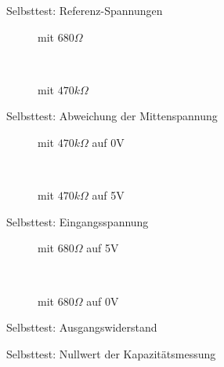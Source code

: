 \begin{figure}[H]
  \centering
  
  \caption{Selbsttest: Referenz-Spannungen}
  \label{fig:SelfTref}
\end{figure}

\begin{figure}[H]
  \begin{subfigure}[b]{9cm}
    \centering
    \resizebox{9cm}{!}{}
    \caption{mit \(680 \Omega\)}
    \label{fig:SelfTMitL}
  \end{subfigure}
  ~
  \begin{subfigure}[b]{9cm}
    \centering
    \resizebox{9cm}{!}{}
    \caption{mit \(470 k\Omega\)}
    \label{fig:SelfTMitH}
  \end{subfigure}
  \caption{Selbsttest: Abweichung der Mittenspannung}
\end{figure}

\begin{figure}[H]
  \begin{subfigure}[b]{9cm}
  \centering
    \resizebox{9cm}{!}{}
    \caption{mit \(470 k\Omega\) auf 0V}
    \label{fig:SelfTlowH}
  \end{subfigure}
  ~
  \begin{subfigure}[b]{9cm}
  \centering
    \resizebox{9cm}{!}{}
    \caption{mit \(470 k\Omega\) auf 5V}
    \label{fig:SelfTtopH}
  \end{subfigure}
  \caption{Selbsttest: Eingangsspannung}
\end{figure}

\begin{figure}[H]
  \begin{subfigure}[b]{9cm}
  \centering
    \resizebox{9cm}{!}{}
    \caption{mit \(680 \Omega\) auf 5V}
    \label{fig:SelfTRoL}
  \end{subfigure}
  ~
  \begin{subfigure}[b]{9cm}
  \centering
    \resizebox{9cm}{!}{}
    \caption{mit \(680 \Omega\) auf 0V}
    \label{fig:SelfTRoH}
  \end{subfigure}
  \caption{Selbsttest: Ausgangswiderstand}
\end{figure}

\begin{figure}[H]
  \centering
  \resizebox{9cm}{!}{}
  \caption{Selbsttest: Nullwert der Kapazit\"atsmessung}
  \label{fig:SelfTcap}
\end{figure}

